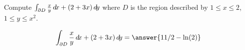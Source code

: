 \documentclass{ximera}
\author{David Guichard \and Neal Koblitz \and H. Jerome Keisler \and Albert Scheller \and Barry Balof \and Mike Wills \and Matthew Carr}
\begin{document}
\begin{exercise}




Compute $\int_{\partial D}\frac{x}{y}\mathop{}\!d\! x+(2+3x)\mathop{}\!d\! y$ where $D$ is the region described by $1\le x\le 2$, $1\le y\le x^2$. 
 

\begin{prompt}
\[
\int_{\partial D}\frac{x}{y}\d x+(2+3x)\d y=\answer{11/2-\ln(2)}
\]
\end{prompt}

\end{exercise}
\end{document}
